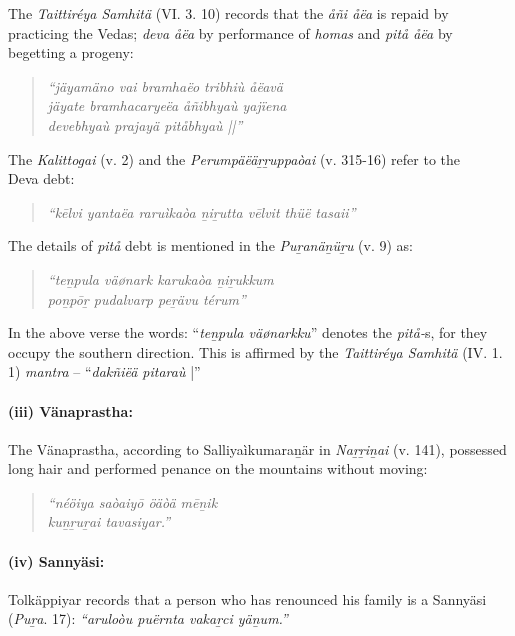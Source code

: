 The \textit{Taittiréya Samhitä} (VI. 3. 10) records that the \textit{åñi åëa} is repaid by practicing the Vedas; \textit{deva åëa} by performance of \textit{homas} and \textit{pitå åëa} by begetting a progeny:

\begin{verse}
\textit{“jäyamäno vai bramhaëo tribhiù åëavä}\\\textit{jäyate bramhacaryeëa åñibhyaù yajïena}\\\textit{ devebhyaù prajayä pitåbhyaù ||”}
\end{verse}

The \textit{Kalittogai} (v. 2) and the \textit{Perumpäëäṟṟuppaòai} (v. 315-16) refer to the \\Deva debt:

\begin{verse}
\textit{“kēlvi yantaëa raruìkaòa ṉiṟutta vēlvit thüë tasaii”}
\end{verse}

The details of \textit{pitå} debt is mentioned in the \textit{Puṟanäṉüṟu} (v. 9) as:

\begin{verse}
\textit{“teṉpula väønark karukaòa ṉiṟukkum\\ poṉpōṟ pudalvarp peṟävu térum”}
\end{verse}

In the above verse the words: “\textit{teṉpula väønarkku}” denotes the \textit{pitå-}s, for they occupy the southern direction. This is affirmed by the \textit{Taittiréya Samhitä} (IV. 1. 1) \textit{mantra} – “\textit{dakñiëä pitaraù} |”


\paragraph*{(iii) Vänaprastha:}

The Vänaprastha, according to Salliyaìkumaraṉär in \textit{Naṟṟiṉai} (v. 141), possessed long hair and performed penance on the mountains without moving:

\begin{verse}
\textit{“néöiya saòaiyō öäòä mēṉik\\ kuṉṟuṟai tavasiyar.”}
\end{verse}


\paragraph*{(iv) Sannyäsi:}

Tolkäppiyar records that a person who has renounced his family is a Sannyäsi (\textit{Puṟa}. 17): \textit{“aruloòu puërnta vakaṟci yäṉum.”}

